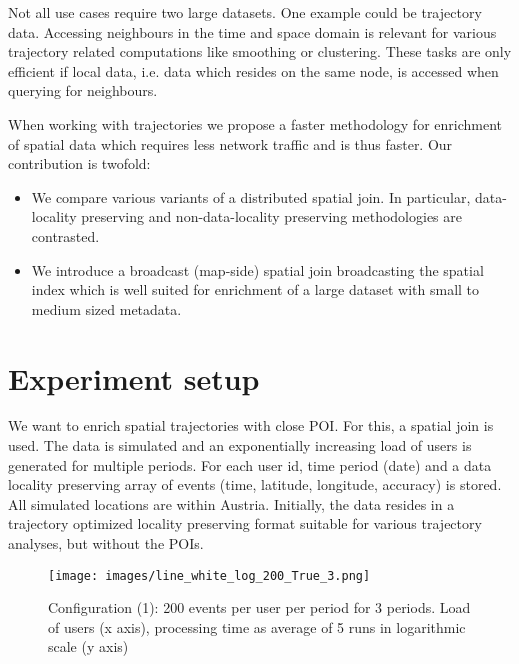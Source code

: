 \documentclass[conference]{IEEEtran}
\newcommand{\mycaption}[1]{\stepcounter{figure}%
  {\footnotesize Fig. \thefigure.\hspace{3pt} #1}}
\begin{document}
Not all use cases require two large datasets. One example could be trajectory data.
Accessing neighbours in the time and space domain is relevant for various trajectory related 
computations like smoothing or clustering.
These tasks are only efficient if local data, i.e. data which resides on the same node, is accessed when querying for neighbours.

When working with trajectories we propose a faster methodology for enrichment of spatial data which requires less network traffic and is thus faster. Our contribution is twofold:
\begin{itemize}
  \item We compare various variants of a distributed spatial join. In particular, data-locality preserving and non-data-locality preserving methodologies are contrasted.
  \item We introduce a broadcast (map-side) spatial join broadcasting the spatial index which is well suited for enrichment of a large dataset with small to medium sized metadata.
\end{itemize}

\section{Experiment setup}
We want to enrich spatial trajectories with close POI. For this, a spatial join is used.
The data is simulated and an exponentially increasing load of users is generated for multiple periods.
For each user id, time period (date) and a data locality preserving array of events (time, 
latitude, longitude, accuracy) is stored.
All simulated locations are within Austria.
Initially, the data resides in a trajectory optimized locality preserving format suitable for various trajectory analyses, but without the POIs.

\begin{figure*}
\centering\texttt{[image: images/line\_white\_log\_200\_True\_3.png]}
\centering\caption{Configuration (1): 200 events per user per period for 3 periods. Load of users (x axis), processing time as average of 5 runs in logarithmic scale (y axis)}
\label{fig:results}
\end{figure*}
\end{document}
